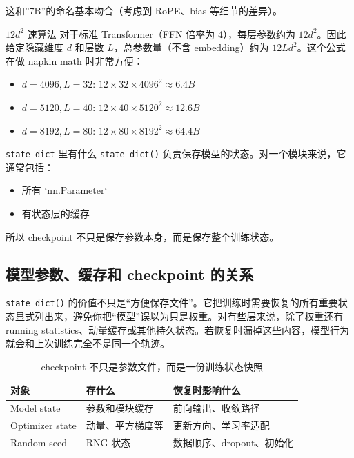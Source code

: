 \documentclass[a4paper]{article}
\begin{document}
这和”7B”的命名基本吻合（考虑到 RoPE、bias 等细节的差异）。

\begin{importantbox}{$12d^2$ 速算法}
对于标准 Transformer（FFN 倍率为 4），每层参数约为 $12d^2$。因此给定隐藏维度 $d$ 和层数 $L$，总参数量（不含 embedding）约为 $12Ld^2$。这个公式在做 napkin math 时非常方便：
\begin{itemize}
    \item $d=4096, L=32$: $12 \times 32 \times 4096^2 \approx 6.4B$
    \item $d=5120, L=40$: $12 \times 40 \times 5120^2 \approx 12.6B$
    \item $d=8192, L=80$: $12 \times 80 \times 8192^2 \approx 64.4B$
\end{itemize}
\end{importantbox}

\begin{knowledgebox}{\texttt{state\_dict} 里有什么}
\texttt{state\_dict()} 负责保存模型的状态。对一个模块来说，它通常包括：
\begin{itemize}
    \item 所有 `nn.Parameter`
    \item 有状态层的缓存
\end{itemize}
所以 checkpoint 不只是保存参数本身，而是保存整个训练状态。
\end{knowledgebox}

\subsection{模型参数、缓存和 checkpoint 的关系}

\texttt{state\_dict()} 的价值不只是“方便保存文件”。它把训练时需要恢复的所有重要状态显式列出来，避免你把“模型”误以为只是权重。对有些层来说，除了权重还有 running statistics、动量缓存或其他持久状态。若恢复时漏掉这些内容，模型行为就会和上次训练完全不是同一个轨迹。

\begin{table}[H]
\centering
\begin{tabular}{p{}p{}p{}}
\toprule
\textbf{对象} & \textbf{存什么} & \textbf{恢复时影响什么} \\
\midrule
Model state & 参数和模块缓存 & 前向输出、收敛路径 \\
Optimizer state & 动量、平方梯度等 & 更新方向、学习率适配 \\
Random seed & RNG 状态 & 数据顺序、dropout、初始化 \\
\bottomrule
\end{tabular}
\caption{checkpoint 不只是参数文件，而是一份训练状态快照}
\end{table}
\end{document}
